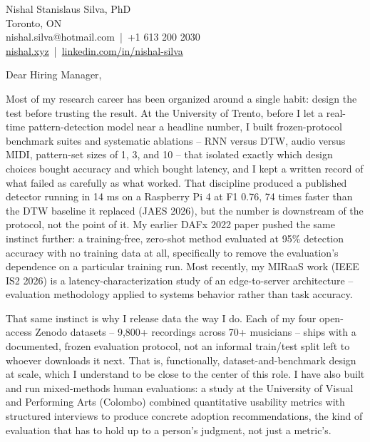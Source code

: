 \documentclass[11pt]{article}
\begin{document}
\pagestyle{empty}

\begin{flushleft}
Nishal Stanislaus Silva, PhD \\
Toronto, ON \\
nishal.silva@hotmail.com \,|\, +1 613 200 2030 \\
\href{https://nishal.xyz}{nishal.xyz} \,|\, \href{https://www.linkedin.com/in/nishal-silva}{linkedin.com/in/nishal-silva}
\end{flushleft}

\vspace{1em}

Dear Hiring Manager,

Most of my research career has been organized around a single habit: design the test before trusting the result. At the University of Trento, before I let a real-time pattern-detection model near a headline number, I built frozen-protocol benchmark suites and systematic ablations -- RNN versus DTW, audio versus MIDI, pattern-set sizes of 1, 3, and 10 -- that isolated exactly which design choices bought accuracy and which bought latency, and I kept a written record of what failed as carefully as what worked. That discipline produced a published detector running in 14 ms on a Raspberry Pi 4 at F1 0.76, 74 times faster than the DTW baseline it replaced (JAES 2026), but the number is downstream of the protocol, not the point of it. My earlier DAFx 2022 paper pushed the same instinct further: a training-free, zero-shot method evaluated at 95\% detection accuracy with no training data at all, specifically to remove the evaluation's dependence on a particular training run. Most recently, my MIRaaS work (IEEE IS2 2026) is a latency-characterization study of an edge-to-server architecture -- evaluation methodology applied to systems behavior rather than task accuracy.

That same instinct is why I release data the way I do. Each of my four open-access Zenodo datasets -- 9,800+ recordings across 70+ musicians -- ships with a documented, frozen evaluation protocol, not an informal train/test split left to whoever downloads it next. That is, functionally, dataset-and-benchmark design at scale, which I understand to be close to the center of this role. I have also built and run mixed-methods human evaluations: a study at the University of Visual and Performing Arts (Colombo) combined quantitative usability metrics with structured interviews to produce concrete adoption recommendations, the kind of evaluation that has to hold up to a person's judgment, not just a metric's.
\end{document}
